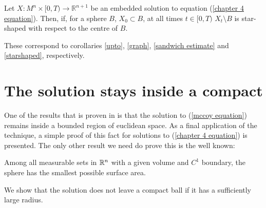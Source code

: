\begin{cor}
	Let $ X : M^n \times [0, T) \to \mathbb{R}^{n+1} $ be an embedded solution to equation (\ref{chapter 4 equation}). Then, if, for a sphere $B$, $X_0\subset B$, at all times $t \in [0, T)$ $X_t\setminus B$ is star-shaped with respect to the centre of $B$.\label{starshaped ch4}
\end{cor}

These correspond to corollaries \ref{upto}, \ref{graph}, \ref{sandwich estimate} and \ref{starshaped}, respectively.
 
\section{The solution stays inside a compact}

One of the results that is proven in \cite{mccoy} is that the solution to (\ref{mccoy equation}) remains inside a bounded region of euclidean space. As a final application of the technique, a simple proof of this fact for solutions to (\ref{chapter 4 equation}) is presented. The only other result we need do prove this is the well known:
\begin{theorem}
	Among all measurable sets in $\mathbb{R}^n$ with a given volume and $C^1$ boundary, the sphere has the smallest possible surface area.
\end{theorem} 
We show that the solution does not leave a compact ball if it has a sufficiently large radius.
\begin{comment}
First, we want to prove the following lemma: 
	
	\begin{lemma}
		Let $X:M^n\times [0,T) \rightarrow \R^{n+1}$ be a $C^2$ embedded solution to equation (\ref{chapter 4 equation}), let $\pi$ be a plane. If $X_0 \subset H^-(\pi)$, then it is not possible that $X_t \subset H^+(\pi)$ for all times $t \in [0,T)$\label{cannot cross plane ch4}
	\end{lemma}
	In other words, a solution cannot completely cross from one side of a given plane to the other side.
	\begin{proof}
		Suppose by contradiction that this happens. We can always reflect $X_t$ strictly about $\pi$, by theorem \ref{chow gulliver chapter 4}, because it does not intersect $X_0$. This implies that $X_t^\pi\cap H^-(\pi) \subset \mathrm{int}(X_t)\cap  H^-(\pi)$. But $X_t \subset H^+(\pi)$  implies that $\mathrm{int}(X_t)\cap  H^-(\pi)=\emptyset$ and  $\emptyset \neq X_t^\pi \subset H^-(\pi)$, a contradiction
	\end{proof}
	Finally, we show that the solution does not leave a compact ball if it has a sufficiently large radius. 
\end{comment}
